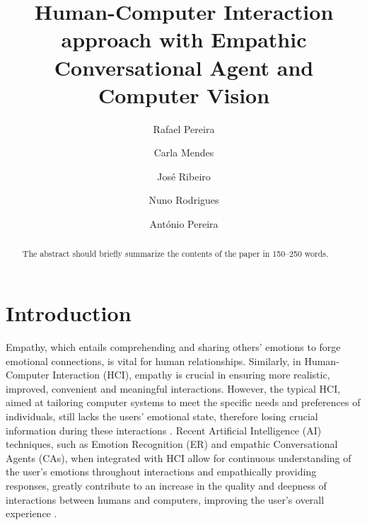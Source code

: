 \documentclass[runningheads]{llncs}
\begin{document}
%
\title{Human-Computer Interaction approach with Empathic Conversational Agent and Computer Vision}
%
%
\author{Rafael Pereira \and
Carla Mendes \and
José Ribeiro \and
Nuno Rodrigues \and
António Pereira}
%
%
%
\maketitle              %
%
\begin{abstract}
The abstract should briefly summarize the contents of the paper in
150--250 words.

\end{abstract}
%
%
%

\section{Introduction}

Empathy, which entails comprehending and sharing others' emotions to forge emotional connections, is vital for human relationships. Similarly, in Human-Computer Interaction (HCI), empathy is crucial in ensuring more realistic, improved, convenient and meaningful interactions. However, the typical HCI, aimed at tailoring computer systems to meet the specific needs and preferences of individuals, still lacks the users' emotional state, therefore losing crucial information during these interactions \cite{jaiswal_facial_2020}.  Recent Artificial Intelligence (AI) techniques, such as Emotion Recognition (ER) and empathic Conversational Agents (CAs), when integrated with HCI allow for continuous understanding of the user's emotions throughout interactions and empathically providing responses, greatly contribute to an increase in the quality and deepness of interactions between humans and computers, improving the user's overall experience \cite{santos_approaches_2018}.
\end{document}
